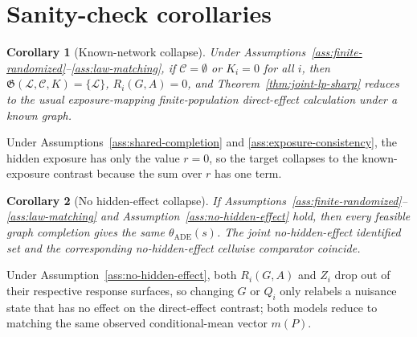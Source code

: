 \documentclass[11pt]{article}
\theoremstyle{definition}
\theoremstyle{plain}
\newtheorem{corollary}{Corollary}
\theoremstyle{remark}
\begin{document}
\section{Sanity-check corollaries}
\begin{corollary}[Known-network collapse]\label{cor:known-network}
Under Assumptions~\ref{ass:finite-randomized}--\ref{ass:law-matching}, if \(\mathcal C=\emptyset\) or \(K_i=0\) for all \(i\), then \(\mathfrak G(\mathcal L,\mathcal C,K)=\{\mathcal L\}\), \(R_i(G,A)=0\), and Theorem~\ref{thm:joint-lp-sharp} reduces to the usual exposure-mapping finite-population direct-effect calculation under a known graph.
\end{corollary}
Under Assumptions~\ref{ass:shared-completion} and \ref{ass:exposure-consistency}, the hidden exposure has only the value \(r=0\), so the target collapses to the known-exposure contrast because the sum over \(r\) has one term.

\begin{corollary}[No hidden-effect collapse]\label{cor:no-hidden-effect}
If Assumptions~\ref{ass:finite-randomized}--\ref{ass:law-matching} and Assumption~\ref{ass:no-hidden-effect} hold, then every feasible graph completion gives the same \(\theta_{\mathrm{ADE}}(s)\).  The joint no-hidden-effect identified set and the corresponding no-hidden-effect cellwise comparator coincide.
\end{corollary}
Under Assumption~\ref{ass:no-hidden-effect}, both \(R_i(G,A)\) and \(Z_i\) drop out of their respective response surfaces, so changing \(G\) or \(Q_i\) only relabels a nuisance state that has no effect on the direct-effect contrast; both models reduce to matching the same observed conditional-mean vector \(m(P)\).
\end{document}
